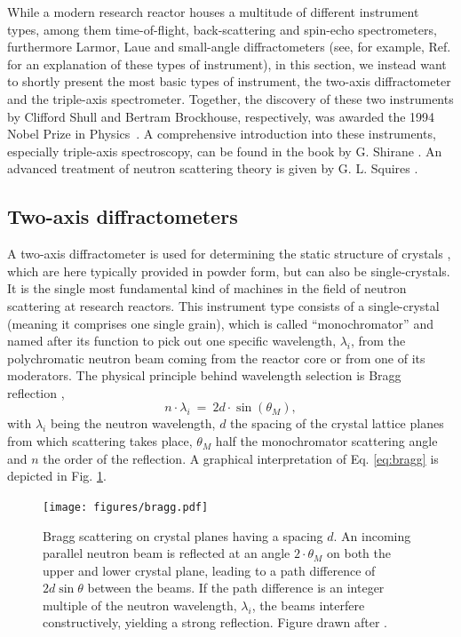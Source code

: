While a modern research reactor houses a multitude of different instrument types, among them time-of-flight,
back-scattering and spin-echo spectrometers, furthermore Larmor, Laue and small-angle diffractometers (see, for example, Ref. \cite{ExperimentalFacilites} for an explanation of these types of instrument), in
this section, we instead want to shortly present the most basic types of instrument, the two-axis diffractometer
and the triple-axis spectrometer. Together, the discovery of these two instruments by Clifford Shull and Bertram Brockhouse,
respectively, was awarded the 1994 Nobel Prize in Physics~\cite{web_nobel1994}.
A comprehensive introduction into these instruments, especially triple-axis spectroscopy, can be found in the
book by G. Shirane \cite{Shirane2002}. An advanced treatment of neutron scattering theory is given by
G. L. Squires \cite{Squires2012}.


\subsection{Two-axis diffractometers}

A two-axis diffractometer is used for determining the static structure of crystals \cite[pp. 89f]{Gross2012},
which are here typically provided in powder form, but can also be single-crystals.
It is the single most fundamental kind of machines in the field of
neutron scattering at research reactors. This instrument type consists of a single-crystal (meaning it comprises one
single grain), which is called ``monochromator'' and named after its function to pick out one specific wavelength,
$\lambda_i$, from the polychromatic neutron beam coming from the reactor core or from one of its moderators.
The physical principle behind wavelength selection is Bragg reflection \cite[p. 68]{Gross2012} \cite[p. 13]{Shirane2002},
\begin{equation}
	\label{eq:bragg}
	n \cdot \lambda_i \ =\  2 d \cdot \sin\left( \theta_M \right),
\end{equation}
with $\lambda_i$ being the neutron wavelength, $d$ the spacing of the crystal lattice planes from which scattering
takes place, $\theta_M$ half the monochromator scattering angle and $n$ the order of the reflection. A graphical
interpretation of Eq. \ref{eq:bragg} is depicted in Fig. \ref{fig:braggscattering}.

\begin{figure}[htb]
	\centering
	\texttt{[image: figures/bragg.pdf]}
	\caption[Bragg scattering.]{
		Bragg scattering on crystal planes having a spacing $d$. An incoming parallel neutron beam is reflected at an
		angle $2 \cdot \theta_M$ on both the upper and lower crystal plane, leading to a path difference of
		$2d \sin\theta$ between the beams. If the path difference is an integer multiple of the neutron wavelength,
		$\lambda_i$, the beams interfere constructively, yielding a strong reflection.
		Figure drawn after \cite[p. 68, Fig. 2.7]{Gross2012}. }
	\label{fig:braggscattering}
\end{figure}

